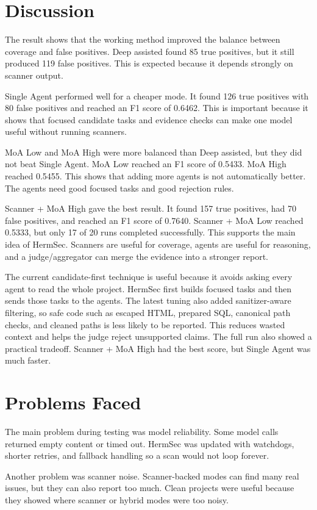 \documentclass[sigconf,nonacm]{acmart}
\begin{document}
\section{Discussion}
The result shows that the working method improved the balance between coverage and false positives. Deep assisted found 85 true positives, but it still produced 119 false positives. This is expected because it depends strongly on scanner output.

Single Agent performed well for a cheaper mode. It found 126 true positives with 80 false positives and reached an F1 score of 0.6462. This is important because it shows that focused candidate tasks and evidence checks can make one model useful without running scanners.

MoA Low and MoA High were more balanced than Deep assisted, but they did not beat Single Agent. MoA Low reached an F1 score of 0.5433. MoA High reached 0.5455. This shows that adding more agents is not automatically better. The agents need good focused tasks and good rejection rules.

Scanner + MoA High gave the best result. It found 157 true positives, had 70 false positives, and reached an F1 score of 0.7640. Scanner + MoA Low reached 0.5333, but only 17 of 20 runs completed successfully. This supports the main idea of HermSec. Scanners are useful for coverage, agents are useful for reasoning, and a judge/aggregator can merge the evidence into a stronger report.

The current candidate-first technique is useful because it avoids asking every agent to read the whole project. HermSec first builds focused tasks and then sends those tasks to the agents. The latest tuning also added sanitizer-aware filtering, so safe code such as escaped HTML, prepared SQL, canonical path checks, and cleaned paths is less likely to be reported. This reduces wasted context and helps the judge reject unsupported claims. The full run also showed a practical tradeoff. Scanner + MoA High had the best score, but Single Agent was much faster.

\section{Problems Faced}
The main problem during testing was model reliability. Some model calls returned empty content or timed out. HermSec was updated with watchdogs, shorter retries, and fallback handling so a scan would not loop forever.

Another problem was scanner noise. Scanner-backed modes can find many real issues, but they can also report too much. Clean projects were useful because they showed where scanner or hybrid modes were too noisy.
\end{document}
